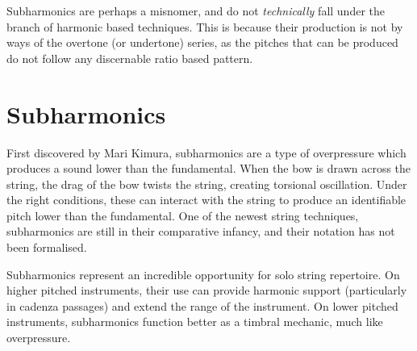 Subharmonics are perhaps a misnomer, and do not \emph{technically} fall under the branch of harmonic based techniques.
This is because their production is not by ways of the overtone (or undertone) series, as the pitches that can be produced do not follow any discernable ratio based pattern.





\newpage
\section{Subharmonics}
First discovered by Mari Kimura, subharmonics are a type of overpressure which produces a sound lower than the fundamental.\autocite{kimuraHowProduceSubharmonics1999} 
When the bow is drawn across the string, the drag of the bow twists the string, creating torsional oscillation. 
Under the right conditions, these can interact with the string to produce an identifiable pitch lower than the fundamental.\autocite{Subharmonics2006} 
One of the newest string techniques, subharmonics are still in their comparative infancy, and their notation has not been formalised. 

Subharmonics represent an incredible opportunity for solo string repertoire. 
On higher pitched instruments, their use can provide harmonic support (particularly in cadenza passages) and extend the range of the instrument. 
On lower pitched instruments, subharmonics function better as a timbral mechanic, much like overpressure. 




